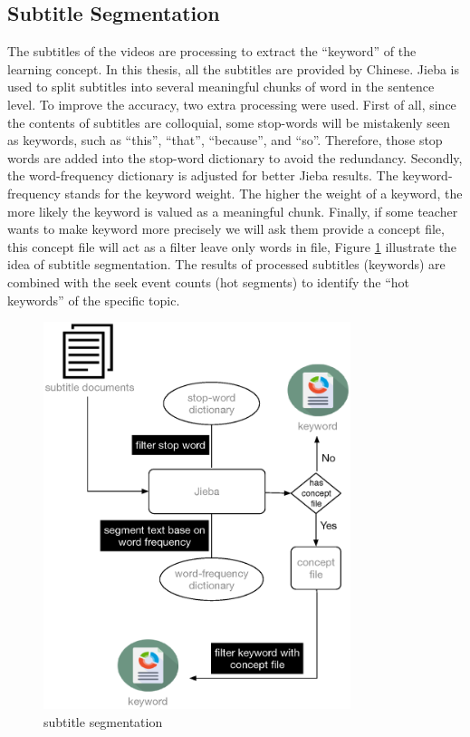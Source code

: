 \subsection{Subtitle Segmentation}
The subtitles of the videos are processing to extract the ``keyword'' of the learning concept. In this thesis, all the subtitles are provided by Chinese. Jieba is used to split subtitles into several meaningful chunks of word in the sentence level.
To improve the accuracy, two extra processing were used. First of all, since the contents of subtitles are colloquial, some stop-words will be mistakenly seen as keywords, such as ``this'', ``that'', ``because'', and ``so''. Therefore, those stop words are added into the stop-word dictionary to avoid the redundancy. Secondly, the word-frequency dictionary is adjusted for better Jieba results. The keyword-frequency stands for the keyword weight. The higher the weight of a keyword, the more likely the keyword is valued as a meaningful chunk.
Finally, if some teacher wants to make keyword more precisely we will ask them provide a concept file, this concept file will act as a filter leave only words in file, Figure \ref{fig:subtitleseg} illustrate the idea of subtitle segmentation.
The results of processed subtitles (keywords) are combined with the seek event counts (hot segments) to identify the “hot keywords” of the specific topic.

\begin{figure}[H]
    \centering
    \includegraphics[width = 0.8\textwidth]{fig/subtitleseg.eps}
    \caption{subtitle segmentation}
    \label{fig:subtitleseg}
\end{figure}

